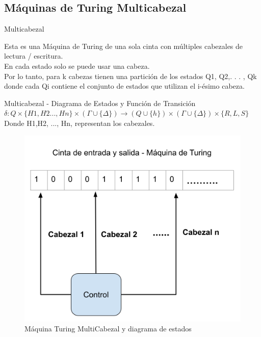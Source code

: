 \documentclass[11pt]{beamer}
\begin{document}
	\subsection{Máquinas de Turing Multicabezal}
	    \begin{frame}{Multicabezal}
			\justifying
			
			Esta es una Máquina de Turing de una sola cinta con múltiples cabezales de lectura / escritura. \\
			En cada estado solo se puede usar una cabeza. \\
			Por lo tanto, para k cabezas
tienen una partición de los estados Q1, Q2,. . . , Qk donde cada Qi contiene el conjunto de estados que utilizan el i-ésimo
cabeza. 
			
		\end{frame}
	\begin{frame}{Multicabezal - Diagrama de Estados y Función de Transición }
			\justifying
			$\delta : Q  \times \{ H1 , H2 ... , Hn \}  \times (\Gamma \cup \{ \Delta\}) \rightarrow  (Q \cup \{ h \}) \times (\Gamma \cup \{\Delta\}) \times \{R,L,S\}$ \\ 
			Donde H1,H2, ..., Hn, representan los cabezales. \\
			\begin{figure}[H]
				\centering
				\includegraphics[scale=0.35]{img/mulltihead.png}
				\caption{Máquina Turing MultiCabezal y diagrama de estados}
				\label{fig: MultiHead}
			\end{figure}
			
			
		\end{frame}
\end{document}
